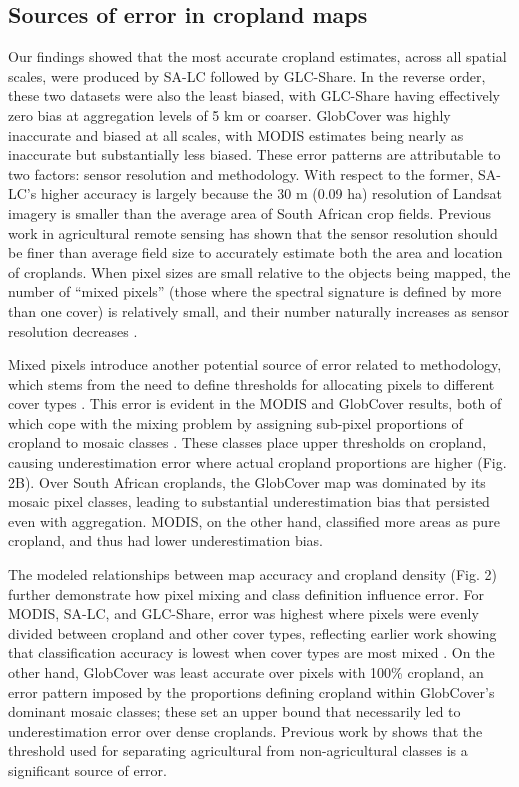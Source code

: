\documentclass[12 pt, titlepage, a4paper]{article}
\begin{document}
\subsection*{Sources of error in cropland maps}
\vspace{-0.2 cm}
Our findings showed that the most accurate cropland estimates, across all spatial scales, were produced by SA-LC followed by GLC-Share. In the reverse order, these two datasets were also the least biased, with GLC-Share having effectively zero bias at aggregation levels of 5 km or coarser.  GlobCover was highly inaccurate and biased at all scales, with MODIS estimates being nearly as inaccurate but substantially less biased. These error patterns are attributable to two factors: sensor resolution and methodology. With respect to the former, SA-LC's higher accuracy is largely because the 30 m (0.09 ha) resolution of Landsat imagery is smaller than the average area of South African crop fields. Previous work in agricultural remote sensing has shown that the sensor resolution should be finer than average field size to accurately estimate both the area and location of croplands\citep{ozdogan_resolution_2006,pax-lenney_effect_1997}. When pixel sizes are small relative to the objects being mapped, the number of ``mixed pixels'' (those where the spectral signature is defined by more than one cover) is relatively small, and their number naturally increases as sensor resolution decreases \citep{ozdogan_resolution_2006}. 

Mixed pixels introduce another potential source of error related to methodology, which stems from the need to define thresholds for allocating pixels to different cover types \citep{ozdogan_resolution_2006}. This error is evident in the MODIS and GlobCover results, both of which cope with the mixing problem by assigning sub-pixel proportions of cropland to mosaic classes \citep{friedl_modis_2010,arino_global_2012}. These classes place upper thresholds on cropland, causing underestimation error where actual cropland proportions are higher  (Fig. 2B). Over South African croplands, the GlobCover map was dominated by its mosaic pixel classes, leading to substantial underestimation bias that persisted even with aggregation. MODIS, on the other hand, classified more areas as pure cropland, and thus had lower underestimation bias.  

The modeled relationships between map accuracy and cropland density (Fig. 2) further demonstrate how pixel mixing and class definition influence error. For MODIS, SA-LC, and GLC-Share, error was highest where pixels were evenly divided between cropland and other cover types, reflecting earlier work showing that classification accuracy is lowest when cover types are most mixed \citep{verburg_challenges_2011,gross_monitoring_2013}. On the other hand, GlobCover was least accurate over pixels with 100\% cropland, an error pattern imposed by the proportions defining cropland within GlobCover's dominant mosaic classes; these set an upper bound that necessarily led to underestimation error over dense croplands. Previous work by \citet{ozdogan_resolution_2006} shows that the threshold used for separating agricultural from non-agricultural classes is a significant source of error.   
\end{document}
